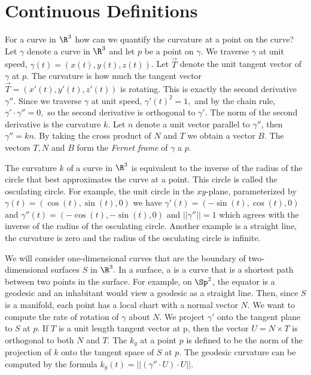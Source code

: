 \section{Continuous Definitions}

For a curve in $\R^3$ how can we quantify the curvature at a point on the curve?
Let $\gamma$ denote a curve in $\R^3$ and let $p$ be a point on $\gamma$.
We traverse $\gamma$ at unit speed, $\gamma(t)=(x(t),y(t),z(t))$.  
Let $\vec{T}$ denote the unit tangent vector of $\gamma$ at $p$. 
The curvature is how much the tangent vector $\vec{T}=(x'(t),y'(t),z'(t))$ is rotating. 
This is exactly the second derivative $\gamma''$. Since we traverse $\gamma$
at unit speed, $\gamma'(t)^2=1,$ and by the chain rule, $\gamma'\cdot \gamma''=0,$
so  the second derivative is orthogonal to $\gamma'$. The norm of the second
derivative is the curvature $k$.
Let $n$ denote a unit vector parallel to $\gamma''$, then $\gamma''=k n$.
By taking the cross product of $N$ and $T$ we obtain a vector $B$.
The vectors $T,N$ and $B$ form the \emph{Fernet frame} of $\gamma$ a $p.$


The curvature $k$ of a curve in $\R^3$ is equivalent to the inverse of the radius
of the circle that best approximates the curve at a point. This circle is called
the osculating circle. 
For example, the unit circle in the $xy$-plane, parameterized by $\gamma(t)=(\cos(t),\sin(t),0)$
we have $\gamma'(t)=(-\sin(t),\cos(t),0)$ and $\gamma''(t)=(-\cos(t),-\sin(t),0)$ and $||\gamma''||=1$
which agrees with the inverse of the radius of the osculating circle.
Another example is a straight line,
the curvature is zero and the radius of the osculating circle is infinite.

We will consider one-dimensional curves that are the boundary of two-dimensional
surfaces $S$ in $\R^3.$ In a surface, a  is a curve that is a shortest path
between two points in the surface. For example, on $\Sp^2$, the equator is a geodesic
and an inhabitant would view a geodesic as a straight line. 
Then, since $S$ is a manifold, each point has a local chart with a normal vector $N$.
We want to compute the rate of rotation of $\gamma$ about $N$.
We project $\gamma'$ onto the tangent plane to $S$ at $p$.
If $T$ is a unit length tangent vector at p, then the vector $U=N\times T$
is orthogonal to both $N$ and $T$.
The  $k_g$ at a point $p$ is defined to be the norm of the projection
of $k$ onto the tangent space of $S$ at $p$. The geodesic curvature can be computed
by the formula $k_g(t)=||(\gamma''\cdot U)\cdot U||.$

